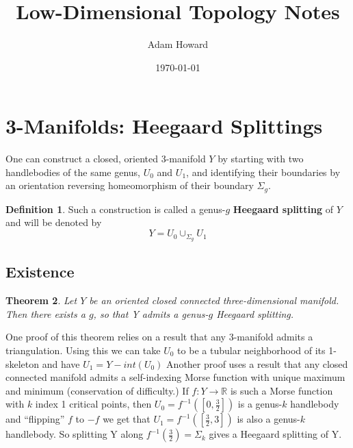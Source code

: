 \documentclass{amsart}
\title{Low-Dimensional Topology Notes}
\author{Adam Howard}
\date{\today}
\newtheorem{theorem}{Theorem}[section]
\theoremstyle{definition}
\newtheorem{definition}[theorem]{Definition}
\begin{document}
\maketitle

\section{3-Manifolds: Heegaard Splittings}
One can construct a closed, oriented 3-manifold $Y$ by starting with two handlebodies of the same genus, $U_{0}$ and  $U_{1}$, and identifying their boundaries by an orientation reversing homeomorphism of their boundary $\Sigma_{g}.$ \begin{definition} Such a construction is called a genus-$g$  \textbf{Heegaard splitting} of $Y$ and will be denoted by $$Y = U_{0} \cup_{\Sigma_{g}} U_{1}$$\end{definition}

\subsection{Existence}

\begin{theorem} Let $Y$ be an oriented closed connected three-dimensional manifold. Then there exists a $g$, so that Y admits a genus-$g$ Heegaard splitting.\end{theorem} One proof of this theorem relies on a result that any 3-manifold admits a triangulation. Using this we can take $U_{0}$ to be a tubular neighborhood of its 1-skeleton and have $U_{1} = Y-int(U_{0})$ \newline \newline Another proof uses a result that any closed connected manifold admits a self-indexing Morse function with unique maximum and minimum (conservation of difficulty.) If $f: Y \rightarrow \mathbb{R}$ is such a Morse function with $k$ index 1 critical points, then $U_{0} = f^{-1}([0, \frac{3}{2}])$ is a genus-$k$ handlebody and ``flipping'' $f$ to $-f$ we get that $U_{1} = f^{-1}([\frac{3}{2}, 3])$ is also a genus-$k$ handlebody. So splitting Y along $f^{-1}(\frac{3}{2}) = \Sigma_{k}$ gives a Heegaard splitting of Y. 
\end{document}
